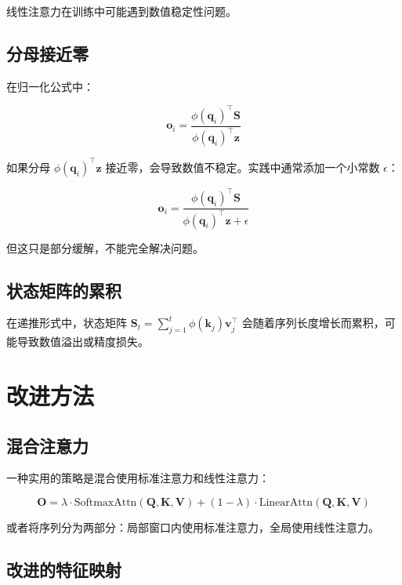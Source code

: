 线性注意力在训练中可能遇到数值稳定性问题。

\subsection{分母接近零}

在归一化公式中：

\begin{equation}
    \mathbf{o}_i = \frac{\phi(\mathbf{q}_i)^\top \mathbf{S}}{\phi(\mathbf{q}_i)^\top \mathbf{z}}
\end{equation}

如果分母 $\phi(\mathbf{q}_i)^\top \mathbf{z}$ 接近零，会导致数值不稳定。实践中通常添加一个小常数 $\epsilon$：

\begin{equation}
    \mathbf{o}_i = \frac{\phi(\mathbf{q}_i)^\top \mathbf{S}}{\phi(\mathbf{q}_i)^\top \mathbf{z} + \epsilon}
\end{equation}

但这只是部分缓解，不能完全解决问题。

\subsection{状态矩阵的累积}

在递推形式中，状态矩阵 $\mathbf{S}_t = \sum_{j=1}^t \phi(\mathbf{k}_j)\mathbf{v}_j^\top$ 会随着序列长度增长而累积，可能导致数值溢出或精度损失。

\section{改进方法}

\subsection{混合注意力}

一种实用的策略是混合使用标准注意力和线性注意力：

\begin{equation}
    \mathbf{O} = \lambda \cdot \text{SoftmaxAttn}(\mathbf{Q}, \mathbf{K}, \mathbf{V}) + (1-\lambda) \cdot \text{LinearAttn}(\mathbf{Q}, \mathbf{K}, \mathbf{V})
\end{equation}

或者将序列分为两部分：局部窗口内使用标准注意力，全局使用线性注意力。

\subsection{改进的特征映射}

